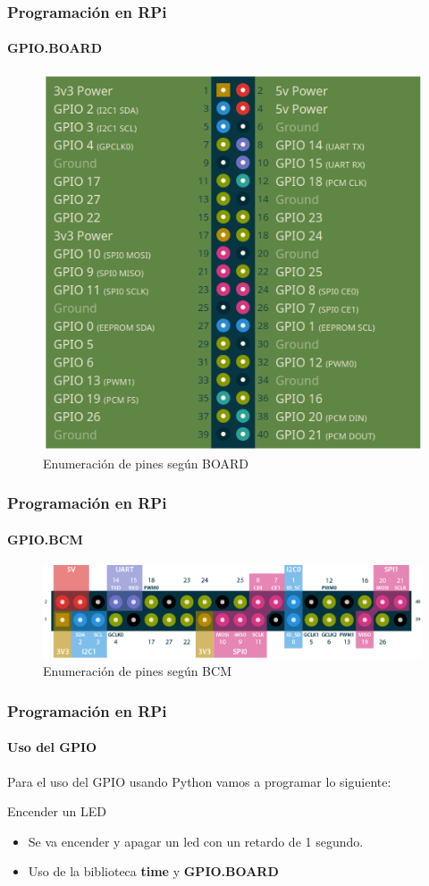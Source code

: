 \documentclass{beamer}
\begin{document}
	\begin{frame}
		\frametitle{Programación en RPi}
		\framesubtitle{GPIO.BOARD}
		\begin{figure}
			\includegraphics[scale=0.4]{rpiboard.png}
			\caption{Enumeración de pines según BOARD}
		\end{figure}
	\end{frame}
	\begin{frame}
		\frametitle{Programación en RPi}
		\framesubtitle{GPIO.BCM}
		\begin{figure}
			\includegraphics[scale=0.34]{rpibcm2.png}
			\caption{Enumeración de pines según BCM}
		\end{figure}
	\end{frame}
	\begin{frame}
		\frametitle{Programación en RPi}
		\framesubtitle{Uso del GPIO}
		Para el uso del GPIO usando Python vamos a programar lo siguiente:
		\begin{mybox}{Encender un LED}
			\begin{itemize}
				\item Se va encender y apagar un led con un retardo de 1 segundo.
				\item Uso de la biblioteca \textbf{time} y \textbf{GPIO.BOARD}
			\end{itemize}
		\end{mybox}
	\end{frame}
\end{document}
